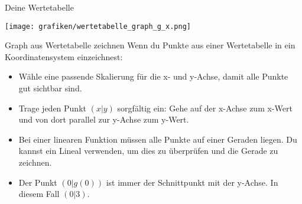\begin{loesungsumgebung}{Deine Wertetabelle}
\begin{center}
\texttt{[image: grafiken/wertetabelle\_graph\_g\_x.png]}
\label{fig:graph_g_x}
\end{center}

\begin{tippumgebung}{Graph aus Wertetabelle zeichnen}
Wenn du Punkte aus einer Wertetabelle in ein Koordinatensystem einzeichnest:
\begin{itemize}
    \item Wähle eine passende Skalierung für die x- und y-Achse, damit alle Punkte gut sichtbar sind.
    \item Trage jeden Punkt $(x|y)$ sorgfältig ein: Gehe auf der x-Achse zum x-Wert und von dort parallel zur y-Achse zum y-Wert.
    \item Bei einer linearen Funktion müssen alle Punkte auf einer Geraden liegen. Du kannst ein Lineal verwenden, um dies zu überprüfen und die Gerade zu zeichnen.
    \item Der Punkt $(0|g(0))$ ist immer der Schnittpunkt mit der y-Achse. In diesem Fall $(0|3)$.
\end{itemize}
\end{tippumgebung}

\end{loesungsumgebung}



